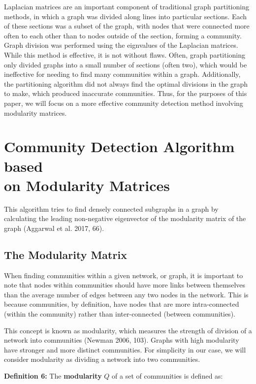 \documentclass{article}
\begin{document}
\bigskip 

Laplacian matrices are an important component of traditional graph partitioning methods, in which a graph was divided along lines into particular sections.
Each of these sections was a subset of the graph, with nodes that were connected more often to each other than to nodes outside of the section, forming a community. 
Graph division was performed using the eignvalues of the Laplacian matrices. While this method is effective, it is not without flaws. 
Often, graph partitioning only divided graphs into a small number of sections (often two), which would be ineffective for needing to find many communities within a graph.
Additionally, the partitioning algorithm did not always find the optimal divisions in the graph to make, which produced inaccurate communities.
Thus, for the purposes of this paper, we will focus on a more effective community detection method involving modularity matrices.

\bigskip 

\section{Community Detection Algorithm based \\ on Modularity Matrices}
This algorithm tries to find densely connected subgraphs in a graph by calculating the leading non-negative eigenvector of the modularity matrix of the graph (Aggarwal et al. 2017, 66). 


\subsection{The Modularity Matrix}
When finding communities within a given network, or graph, it is important to note that nodes within communities should have more links between themselves than the average number of edges between any two nodes in the network. 
This is because communities, by definition, have nodes that are more intra-connected (within the community) rather than inter-connected (between communities).

This concept is known as modularity, which measures the strength of division of a network into communities (Newman 2006, 103). 
Graphs with high modularity have stronger and more distinct communities. 
For simplicity in our case, we will consider modularity as dividing a network into two communities.

\bigskip

\textbf{Definition 6:} The \textbf{modularity} $Q$ of a set of communities is defined as: 
\end{document}
